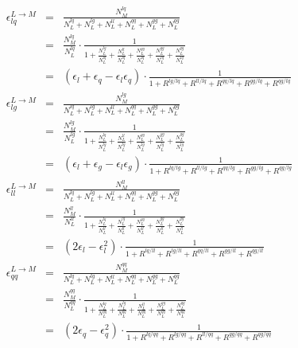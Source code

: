 \documentclass[12pt,oneandhalf,chaparabic,phys,ms,eng]{metu}
\begin{document}
\begin{eqnarray}
\epsilon_{lq}^{L \rightarrow M} & = & \frac{N_{M}^{lq}}{N_{L}^{lq}+N_{L}^{lg}+N_{L}^{ll}+N_{L}^{qq}+N_{L}^{gg}+N_{L}^{qg}} \nonumber \\
& = & 
\frac{N_{M}^{lq}}{N_{L}^{lq}} \cdot \frac{1}{1 + \frac{N_{L}^{lg}}{N_{L}^{lq}} + \frac{N_{L}^{ll}}{N_{L}^{lq}} + \frac{N_{L}^{qq}}{N_{L}^{lq}} + \frac{N_{L}^{gg}}{N_{L}^{lq}} + \frac{N_{L}^{qg}}{N_{L}^{lq}}} \nonumber \\
& = & \left( \epsilon_{l} + \epsilon_{q} - \epsilon_{l} \epsilon_{q} \right) \cdot \frac{1}{1 + R^{lg/lq} + R^{ll/lq} + R^{qq/lq} + R^{gg/lq} + R^{qg/lq}} \label{eq:eps11_}\\
\epsilon_{lg}^{L \rightarrow M} & = & \frac{N_{M}^{lg}}{N_{L}^{lq}+N_{L}^{lg}+N_{L}^{ll}+N_{L}^{qq}+N_{L}^{gg}+N_{L}^{qg}} \nonumber \\
& = & 
\frac{N_{M}^{lg}}{N_{L}^{lg}} \cdot \frac{1}{1 + \frac{N_{L}^{lq}}{N_{L}^{lg}} + \frac{N_{L}^{ll}}{N_{L}^{lg}} + \frac{N_{L}^{qq}}{N_{L}^{lg}} + \frac{N_{L}^{gg}}{N_{L}^{lg}} + \frac{N_{L}^{qg}}{N_{L}^{lg}}} \nonumber \\
& = & \left( \epsilon_{l} + \epsilon_{g} - \epsilon_{l} \epsilon_{g} \right) \cdot \frac{1}{1 + R^{lq/lg} + R^{ll/lg} + R^{qq/lg} + R^{gg/lg} + R^{qg/lg}} \label{eq:eps12__}\\
\epsilon_{ll}^{L \rightarrow M} & = & \frac{N_{M}^{ll}}{N_{L}^{lq}+N_{L}^{lg}+N_{L}^{ll}+N_{L}^{qq}+N_{L}^{gg}+N_{L}^{qg}} \nonumber \\
& = & 
\frac{N_{M}^{ll}}{N_{L}^{ll}} \cdot \frac{1}{1 + \frac{N_{L}^{lq}}{N_{L}^{ll}} + \frac{N_{L}^{lg}}{N_{L}^{ll}} + \frac{N_{L}^{qq}}{N_{L}^{ll}} + \frac{N_{L}^{gg}}{N_{L}^{ll}} + \frac{N_{L}^{qg}}{N_{L}^{ll}}} \nonumber \\
& = & \left( 2 \epsilon_{l} - \epsilon_{l}^{2} \right) \cdot \frac{1}{1 + R^{lq/ll} + R^{lg/ll} + R^{qq/ll} + R^{gg/ll} + R^{qg/ll}} \label{eq:eps13__}\\
\epsilon_{qq}^{L \rightarrow M} & = & \frac{N_{M}^{qq}}{N_{L}^{lq}+N_{L}^{lg}+N_{L}^{ll}+N_{L}^{qq}+N_{L}^{gg}+N_{L}^{qg}} \nonumber \\
& = &
\frac{N_{M}^{qq}}{N_{L}^{qq}} \cdot \frac{1}{1 + \frac{N_{L}^{lq}}{N_{L}^{qq}} + \frac{N_{L}^{lg}}{N_{L}^{qq}} + \frac{N_{L}^{ll}}{N_{L}^{qq}} + \frac{N_{L}^{gg}}{N_{L}^{qq}} + \frac{N_{L}^{qg}}{N_{L}^{qq}}} \nonumber \\
& = & \left( 2 \epsilon_{q} - \epsilon_{q}^{2} \right) \cdot \frac{1}{1 + R^{lq/qq} + R^{lg/qq} + R^{ll/qq} + R^{gg/qq} + R^{qg/qq}} \label{eq:eps14__}\\

\end{eqnarray}
\end{document}
